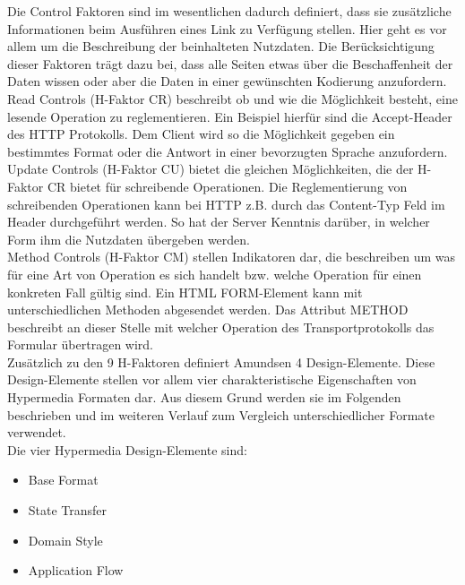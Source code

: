 Die Control Faktoren sind im wesentlichen dadurch definiert, dass sie zusätzliche Informationen beim Ausführen eines Link zu Verfügung stellen. Hier geht es vor allem um die Beschreibung der beinhalteten Nutzdaten. Die Berücksichtigung dieser Faktoren trägt dazu bei, dass alle Seiten etwas über die Beschaffenheit der Daten wissen oder aber die Daten in einer gewünschten Kodierung anzufordern.\\
Read Controls (H-Faktor CR) beschreibt ob und wie die Möglichkeit besteht, eine lesende Operation zu reglementieren. Ein Beispiel hierfür sind die Accept-Header des HTTP Protokolls. Dem Client wird so die Möglichkeit gegeben ein bestimmtes Format oder die Antwort in einer bevorzugten Sprache anzufordern.\\
Update Controls (H-Faktor CU) bietet die gleichen Möglichkeiten, die der H-Faktor CR bietet für schreibende Operationen. Die Reglementierung von schreibenden Operationen kann bei HTTP z.B. durch das Content-Typ Feld im Header durchgeführt werden. So hat der Server Kenntnis darüber, in welcher Form ihm die Nutzdaten übergeben werden.\\
Method Controls (H-Faktor CM) stellen Indikatoren dar, die beschreiben um was für eine Art von Operation es sich handelt bzw. welche Operation für einen konkreten Fall gültig sind. Ein HTML FORM-Element kann mit unterschiedlichen Methoden abgesendet werden. Das Attribut METHOD beschreibt an dieser Stelle mit welcher Operation des Transportprotokolls das Formular übertragen wird.\\

Zusätzlich zu den 9 H-Faktoren definiert Amundsen 4 Design-Elemente. Diese Design-Elemente stellen vor allem vier charakteristische Eigenschaften von Hypermedia Formaten dar. Aus diesem Grund werden sie im Folgenden beschrieben und im weiteren Verlauf zum Vergleich unterschiedlicher Formate verwendet.\\
Die vier Hypermedia Design-Elemente sind:
\begin{itemize}
\item Base Format
\item State Transfer
\item Domain Style
\item Application Flow
\end{itemize}

